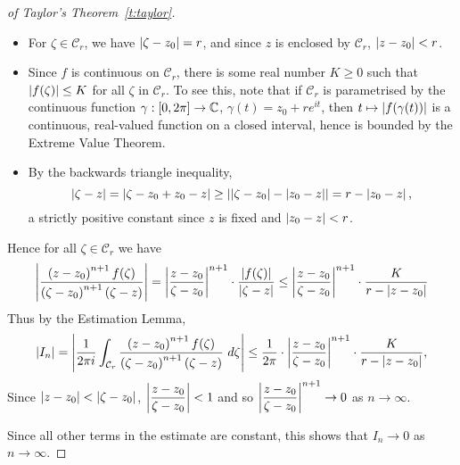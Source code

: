 \begin{proof}[of Taylor's Theorem~\ref{t:taylor}]
\begin{itemize}
\item For $\zeta \in \mathcal{C}_r$, we have $\left| \zeta-z_0 \right|=r$, and since $z$ is enclosed by $\mathcal{C}_r$, $\left| z-z_0 \right|<r$.
\item Since $f$ is continuous on $\mathcal{C}_r$, there is some real number $K \geq 0$ such that $\left| f(\zeta) \right| \leq K$ for all $\zeta$ in $\mathcal{C}_r$.  To see this, note that if $\mathcal{C}_r$ is parametrised by the continuous function $\gamma:[0,2\pi] \to \mathbb{C}$, $\gamma (t) = z_0+r e^{it}$, then $t \mapsto \left| f(\gamma(t)) \right|$ is a continuous, real-valued function on a closed interval, hence is bounded by the Extreme Value Theorem.
\item By the backwards triangle inequality,
\[
\left| \zeta-z \right| = \left| \zeta-z_0+z_0-z \right| \geq \left| \left| \zeta-z_0 \right|-\left| z_0-z \right| \right| = r - \left| z_0-z \right|,
\]
a strictly positive constant since $z$ is fixed and $\left| z_0-z \right|<r$.
\end{itemize}
Hence for all $\zeta \in \mathcal{C}_r$ we have
\[
\left| \frac{\left( z-z_0 \right)^{n+1}f(\zeta)}{\left( \zeta-z_0 \right)^{n+1} \left( \zeta-z \right)}  \right| = \left| \frac{z-z_0}{\zeta-z_0} \right|^{n+1}\cdot \frac{\left| f(\zeta) \right|}{\left| \zeta-z \right|} \leq \left| \frac{z-z_0}{\zeta-z_0} \right|^{n+1} \cdot \frac{K}{r-\left| z-z_0 \right|}
\]
Thus by the Estimation Lemma,
\[
\left| I_n \right| = \left| \frac{1}{2\pi i}\int_{\mathcal{C}_r}  \frac{\left( z-z_0 \right)^{n+1}f(\zeta)}{\left( \zeta-z_0 \right)^{n+1} \left( \zeta-z \right)}\ d\zeta \right| \leq \frac{1}{2\pi} \cdot \left| \frac{z-z_0}{\zeta-z_0} \right|^{n+1} \cdot \frac{K}{r-\left| z-z_0 \right|},
\]
Since $\left| z-z_0 \right|<\left| \zeta-z_0 \right|$, $\left| \dfrac{z-z_0}{\zeta-z_0} \right|<1$ and so
$\displaystyle \left| \frac{z-z_0}{\zeta-z_0} \right|^{n+1} \to 0 $ as  $n \to \infty$.

Since all other terms in the estimate are constant, this shows that $I_n \to 0$ as $n \to \infty$.

\end{proof}

